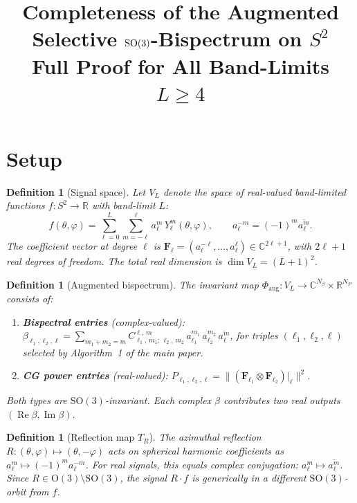 \documentclass[11pt]{article}
\title{Completeness of the Augmented Selective $\SO(3)$-Bispectrum on $S^2$\\
  {\large Full Proof for All Band-Limits $L \ge 4$}}
\author{}
\date{}
\newtheorem{definition}[theorem]{Definition}
\DeclareMathOperator{\im}{Im}
\newcommand{\R}{\mathbb{R}}
\newcommand{\C}{\mathbb{C}}
\newcommand{\SO}{\mathrm{SO}}
\newcommand{\OG}{\mathrm{O}}
\newcommand{\SH}{Y}
\newcommand{\CG}[6]{C^{#5,\,#6}_{#1,\,#2;\,#3,\,#4}}
\newcommand{\norm}[1]{\lVert #1 \rVert}
\newcommand{\conj}[1]{\overline{#1}}
\begin{document}
\maketitle

\section{Setup}

\begin{definition}[Signal space]
Let $V_L$ denote the space of real-valued band-limited functions
$f: S^2 \to \R$ with band-limit $L$:
\[
  f(\theta,\varphi) = \sum_{\ell=0}^{L}\sum_{m=-\ell}^{\ell}
    a_\ell^m \, \SH_\ell^m(\theta,\varphi),
  \qquad
  a_\ell^{-m} = (-1)^m \conj{a_\ell^m}.
\]
The coefficient vector at degree $\ell$ is
$\mathbf{F}_\ell = (a_\ell^{-\ell}, \ldots, a_\ell^{\ell}) \in \C^{2\ell+1}$,
with $2\ell+1$ real degrees of freedom.
The total real dimension is $\dim V_L = (L+1)^2$.
\end{definition}

\begin{definition}[Augmented bispectrum]
The invariant map $\Phi_{\mathrm{aug}}: V_L \to \C^{N_\beta} \times \R^{N_P}$ consists of:
\begin{enumerate}[nosep]
\item \textbf{Bispectral entries} (complex-valued):
  $\beta_{\ell_1,\ell_2,\ell}
  = \sum_{m_1+m_2=m} \CG{\ell_1}{m_1}{\ell_2}{m_2}{\ell}{m}\,
    a_{\ell_1}^{m_1}\,a_{\ell_2}^{m_2}\,\conj{a_\ell^m}$,
  for triples $(\ell_1,\ell_2,\ell)$ selected by
  Algorithm~1 of the main paper.
\item \textbf{CG power entries} (real-valued):
  $P_{\ell_1,\ell_2,\ell}
  = \norm{(\mathbf{F}_{\ell_1} \otimes \mathbf{F}_{\ell_2})|_\ell}^2$.
\end{enumerate}
Both types are $\SO(3)$-invariant.
Each complex $\beta$ contributes two real outputs $(\operatorname{Re}\beta, \im\beta)$.
\end{definition}

\begin{definition}[Reflection map $T_R$]\label{def:TR}
The azimuthal reflection $R: (\theta,\varphi) \mapsto (\theta,-\varphi)$
acts on spherical harmonic coefficients as
$a_\ell^m \mapsto (-1)^m a_\ell^{-m}$.
For real signals, this equals complex conjugation: $a_\ell^m \mapsto \conj{a_\ell^m}$.
Since $R \in \OG(3) \setminus \SO(3)$, the signal $R \cdot f$ is generically
in a \emph{different} $\SO(3)$-orbit from $f$.
\end{definition}
\end{document}
